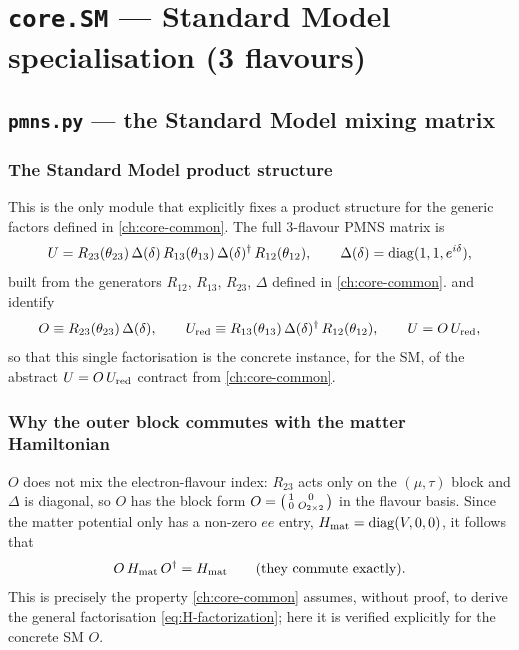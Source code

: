 \chapter{\texttt{core.SM} --- Standard Model specialisation (3 flavours)}
\label{ch:core-sm}

\section{\texttt{pmns.py} --- the Standard Model mixing matrix}


\begin{theorybox}
\subsection*{The Standard Model product structure}
This is the only module that explicitly fixes a product structure for the
generic factors defined in \cref{ch:core-common}. The full 3-flavour PMNS
matrix is
\begin{equation}
  U = R_{23}(\theta_{23})\,\Delta(\delta)\,R_{13}(\theta_{13})\,\Delta(\delta)^\dagger\,R_{12}(\theta_{12}),
  \qquad \Delta(\delta) = \operatorname{diag}(1,1,e^{i\delta}),
\end{equation}
built from the generators $R_{12}$, $R_{13}$, $R_{23}$, $\Delta$ defined in
\cref{ch:core-common}.  and
 identify
\begin{equation}
  O \equiv R_{23}(\theta_{23})\,\Delta(\delta),
  \qquad
  U_{\rm red} \equiv R_{13}(\theta_{13})\,\Delta(\delta)^\dagger\,R_{12}(\theta_{12}),
  \qquad U = O\,U_{\rm red},
\end{equation}
so that this single factorisation is the concrete instance, for the SM,
of the abstract $U=O\,U_{\rm red}$ contract from \cref{ch:core-common}.

\subsection*{Why the outer block commutes with the matter Hamiltonian}
$O$ does not mix the electron-flavour index: $R_{23}$ acts only on the
$(\mu,\tau)$ block and $\Delta$ is diagonal, so $O$ has the block form
$O = \begin{psmallmatrix}1 & 0\\ 0 & O_{2\times2}\end{psmallmatrix}$ in the
flavour basis. Since the matter potential only has a non-zero $ee$ entry,
$H_{\rm mat}=\operatorname{diag}(V,0,0)$, it follows that
\begin{equation}
  O\,H_{\rm mat}\,O^\dagger = H_{\rm mat} \qquad \text{(they commute exactly).}
\end{equation}
This is precisely the property \cref{ch:core-common} assumes, without
proof, to derive the general factorisation \cref{eq:H-factorization}; here
it is verified explicitly for the concrete SM $O$.


\end{theorybox}
